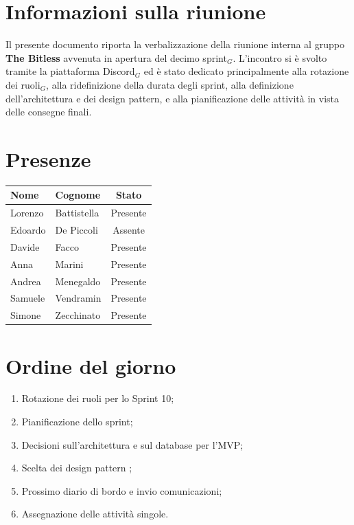 \documentclass[a4paper, 10pt, colorlinks=true, linkcolor=black, urlcolor=blue, citecolor=blue, hidelinks]{article}
\begin{document}
\newcommand{\titolo}{Verbale interno}
\newcommand{\dataverbale}{2026-08-04}
\newcommand{\dataversione}{2026-08-04}
\newcommand{\versione}{1.0.0}
\newcommand{\stato}{Approvato}
\newcommand{\destinatari}{The Bitless, prof. Tullio Vardanega, prof. Riccardo Cardin}
\def\templatedir{../../../../templates}

\begin{titlepage}

\end{titlepage}

\newpage
\tableofcontents

\newpage
{}
\section{Informazioni sulla riunione}
Il presente documento riporta la verbalizzazione della riunione interna al gruppo \textbf{The Bitless} avvenuta in apertura del decimo sprint$_G$. L'incontro si è svolto tramite la piattaforma Discord$_G$ ed è stato dedicato principalmente alla rotazione dei ruoli$_G$, alla ridefinizione della durata degli sprint, alla definizione dell'architettura e dei design pattern, e alla pianificazione delle attività in vista delle consegne finali.

\section{Presenze}
\begin{center}
\begin{tabular}{|l|l|c|}
\hline
\textbf{Nome} & \textbf{Cognome} & \textbf{Stato} \\
\hline
Lorenzo & Battistella & Presente \\
Edoardo & De Piccoli & Assente \\
Davide & Facco & Presente \\
Anna & Marini & Presente \\
Andrea & Menegaldo & Presente \\
Samuele & Vendramin & Presente \\
Simone & Zecchinato & Presente \\
\hline
\end{tabular}
\end{center}

\section{Ordine del giorno}
\begin{enumerate}
    \item Rotazione dei ruoli per lo Sprint 10;
    \item Pianificazione dello sprint;
    \item Decisioni sull'architettura e sul database per l'MVP;
    \item Scelta dei design pattern ;
    \item Prossimo diario di bordo e invio comunicazioni;
    \item Assegnazione delle attività singole.
\end{enumerate}
\end{document}
